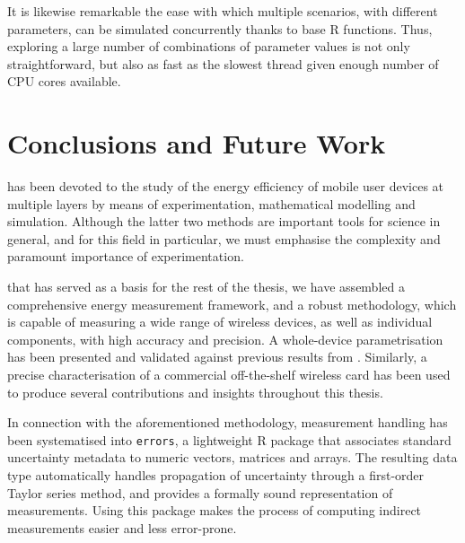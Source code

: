 \documentclass[twoside,nohyper]{tufte-book}
\newcommand{\partseparator}{
  \noindent\leavevmode\leaders\hrule height 0.8ex depth \dimexpr0.4pt-0.8ex\hfill\kern0pt
  \newline~\vspace{-0.5\baselineskip}\newline}
\begin{document}
It is likewise remarkable the ease with which multiple scenarios, with different parameters, can be simulated concurrently thanks to base R functions. Thus, exploring a large number of combinations of parameter values is not only straightforward, but also as fast as the slowest thread given enough number of CPU cores available.

\addtocontents{toc}{\partseparator}

\hypertarget{ch:09}{%
\chapter{Conclusions and Future Work}\label{ch:09}}

 has been devoted to the study of the energy efficiency of mobile user devices at multiple layers by means of experimentation, mathematical modelling and simulation. Although the latter two methods are important tools for science in general, and for this field in particular, we must emphasise the complexity and paramount importance of experimentation.

 that has served as a basis for the rest of the thesis, we have assembled a comprehensive energy measurement framework, and a robust methodology, which is capable of measuring a wide range of wireless devices, as well as individual components, with high accuracy and precision. A whole-device parametrisation has been presented and validated against previous results from \citet{Serrano2014}. Similarly, a precise characterisation of a commercial off-the-shelf wireless card has been used to produce several contributions and insights throughout this thesis.

In connection with the aforementioned methodology, measurement handling has been systematised into \texttt{errors}\cite[0pt]{contrib-03}, a lightweight R package that associates standard uncertainty metadata to numeric vectors, matrices and arrays. The resulting data type automatically handles propagation of uncertainty through a first-order Taylor series method, and provides a formally sound representation of measurements. Using this package makes the process of computing indirect measurements easier and less error-prone.
\end{document}
